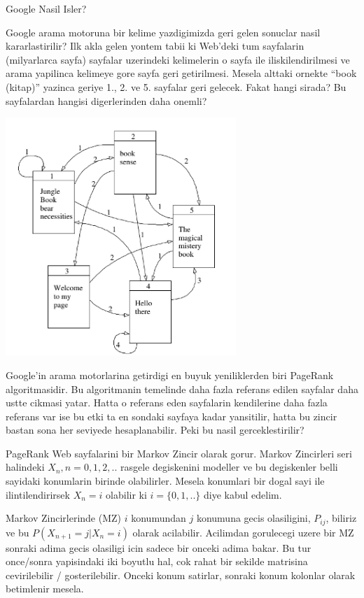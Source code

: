 \documentclass[12pt,fleqn]{article}\usepackage{../common}
\begin{document}
Google Nasil Isler? 

Google arama motoruna bir kelime yazdigimizda geri gelen sonuclar nasil
kararlastirilir? Ilk akla gelen yontem tabii ki Web'deki tum sayfalarin
(milyarlarca sayfa) sayfalar uzerindeki kelimelerin o sayfa ile
iliskilendirilmesi ve arama yapilinca kelimeye gore sayfa geri
getirilmesi. Mesela alttaki ornekte ``book (kitap)'' yazinca geriye 1.,
2. ve 5. sayfalar geri gelecek. Fakat hangi sirada? Bu sayfalardan hangisi
digerlerinden daha onemli?

\includegraphics[height=9cm]{pg2.png}

Google'in arama motorlarina getirdigi en buyuk yeniliklerden biri PageRank
algoritmasidir. Bu algoritmanin temelinde daha fazla referans edilen
sayfalar daha ustte cikmasi yatar. Hatta o referans eden sayfalarin
kendilerine daha fazla referans var ise bu etki ta en sondaki sayfaya kadar
yansitilir, hatta bu zincir bastan sona her seviyede hesaplanabilir. Peki bu
nasil gerceklestirilir?

PageRank Web sayfalarini bir Markov Zincir olarak gorur. Markov Zincirleri
seri halindeki $X_n, n=0,1,2,..$ rasgele degiskenini modeller ve bu
degiskenler belli sayidaki konumlarin birinde olabilirler. Mesela konumlari
bir dogal sayi ile ilintilendirirsek $X_n = i$ olabilir ki $i=\{0,1,..\}$
diye kabul edelim. 

Markov Zincirlerinde (MZ) $i$ konumundan $j$ konumuna gecis olasiligini,
$P_{ij}$, biliriz ve bu $P(X_{n+1} = j | X_{n} = i)$ olarak acilabilir. Acilimdan  
gorulecegi uzere bir MZ sonraki adima gecis olasiligi icin sadece
bir onceki adima bakar. Bu tur once/sonra yapisindaki iki boyutlu hal, 
cok rahat bir sekilde matrisina cevirilebilir / gosterilebilir. Onceki konum 
satirlar, sonraki konum kolonlar olarak betimlenir mesela. 
\end{document}

